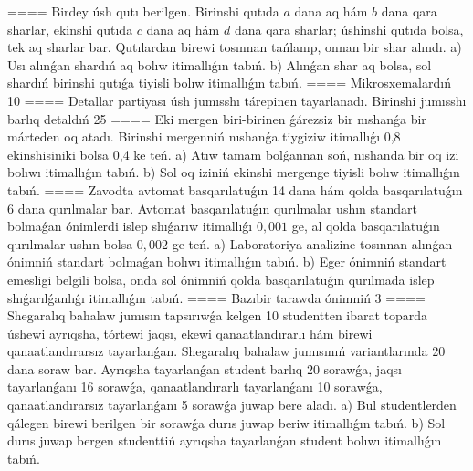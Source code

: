 ====
Birdey úsh qutı berilgen. Birinshi qutıda $a$ dana aq hám $b$ dana qara sharlar, ekinshi qutıda $c$ dana aq hám $d$ dana qara sharlar; úshinshi qutıda bolsa, tek aq sharlar bar. Qutılardan birewi tosınnan tańlanıp, onnan bir shar alındı. a) Usı alınǵan shardıń aq bolıw itimallıǵın tabıń. b) Alınǵan shar aq bolsa, sol shardıń birinshi qutıǵa tiyisli bolıw itimallıǵın tabıń.
====
Mikrosxemalardıń 10%
====
Detallar partiyası úsh jumısshı tárepinen tayarlanadı. Birinshi jumısshı barlıq detaldıń 25%
====
Eki mergen biri-birinen ǵárezsiz bir nıshanǵa bir márteden oq atadı. Birinshi mergenniń nıshanǵa tiygiziw itimallıǵı 0,8 ekinshisiniki bolsa 0,4 ke teń. a) Atıw tamam bolǵannan soń, nıshanda bir oq izi bolıwı itimallıǵın tabıń. b) Sol oq iziniń ekinshi mergenge tiyisli bolıw itimallıǵın tabıń.
====
Zavodta avtomat basqarılatuǵın 14 dana hám qolda basqarılatuǵın 6 dana qurılmalar bar. Avtomat basqarılatuǵın qurılmalar ushın standart bolmaǵan ónimlerdi islep shıǵarıw itimallıǵı $0,001$ ge, al qolda basqarılatuǵın qurılmalar ushın bolsa $0,002$ ge teń. a) Laboratoriya analizine tosınnan alınǵan ónimniń standart bolmaǵan bolıwı itimallıǵın tabıń. b) Eger ónimniń standart emesligi belgili bolsa, onda sol ónimniń qolda basqarılatuǵın qurılmada islep shıǵarılǵanlıǵı itimallıǵın tabıń.
====
Bazıbir tarawda ónimniń 3%
====
Shegaralıq bahalaw jumısın tapsırıwǵa kelgen 10 studentten ibarat toparda úshewi ayrıqsha, tórtewi jaqsı, ekewi qanaatlandırarlı hám birewi qanaatlandırarsız tayarlanǵan. Shegaralıq bahalaw jumısınıń variantlarında 20 dana soraw bar. Ayrıqsha tayarlanǵan student barlıq 20 sorawǵa, jaqsı tayarlanǵanı 16 sorawǵa, qanaatlandırarlı tayarlanǵanı 10 sorawǵa, qanaatlandırarsız tayarlanǵanı 5 sorawǵa juwap bere aladı. a) Bul studentlerden qálegen birewi berilgen bir sorawǵa durıs juwap beriw itimallıǵın tabıń. b) Sol durıs juwap bergen studenttiń ayrıqsha tayarlanǵan student bolıwı itimallıǵın tabıń.
